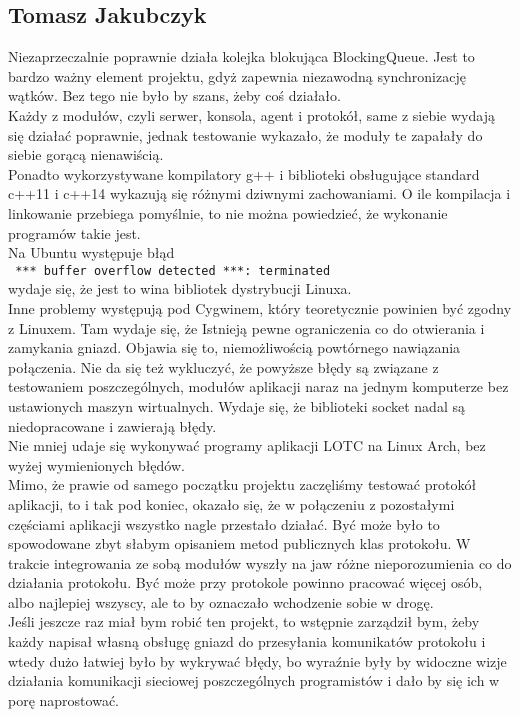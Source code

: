 \documentclass[10pt,a4paper]{article}
\begin{document}
        \subsection{Tomasz Jakubczyk}
            Niezaprzeczalnie poprawnie działa kolejka blokująca BlockingQueue. Jest to bardzo ważny element projektu, gdyż zapewnia niezawodną synchronizację wątków. Bez tego nie było by szans, żeby coś działało. \\
            Każdy z modułów, czyli serwer, konsola, agent i protokół, same z siebie wydają się działać poprawnie, jednak testowanie wykazało, że moduły te zapałały do siebie gorącą nienawiścią. \\
            Ponadto wykorzystywane kompilatory g++ i biblioteki obsługujące standard c++11 i c++14 wykazują się różnymi dziwnymi zachowaniami. O ile kompilacja i linkowanie przebiega pomyślnie, to nie można powiedzieć, że wykonanie programów takie jest. \\
            Na Ubuntu występuje błąd \\
            \texttt{ *** buffer overflow detected ***: terminated } \\
            wydaje się, że jest to wina bibliotek dystrybucji Linuxa. \\
            Inne problemy występują pod Cygwinem, który teoretycznie powinien być zgodny z Linuxem. Tam wydaje się, że Istnieją pewne ograniczenia co do otwierania i zamykania gniazd. Objawia się to, niemożliwością powtórnego nawiązania połączenia. Nie da się też wykluczyć, że powyższe błędy są związane z testowaniem poszczególnych, modułów aplikacji naraz na jednym komputerze bez ustawionych maszyn wirtualnych. Wydaje się, że biblioteki socket nadal są niedopracowane i zawierają błędy. \\
            Nie mniej udaje się wykonywać programy aplikacji LOTC na Linux Arch, bez wyżej wymienionych błędów. \\
            Mimo, że prawie od samego początku projektu zaczęliśmy testować protokół aplikacji, to i tak pod koniec, okazało się, że w połączeniu z pozostałymi częściami aplikacji wszystko nagle przestało działać. Być może było to spowodowane zbyt słabym opisaniem metod publicznych klas protokołu. W trakcie integrowania ze sobą modułów wyszły na jaw różne nieporozumienia co do działania protokołu. Być może przy protokole powinno pracować więcej osób, albo najlepiej wszyscy, ale to by oznaczało wchodzenie sobie w drogę. \\
            Jeśli jeszcze raz miał bym robić ten projekt, to wstępnie zarządził bym, żeby każdy napisał własną obsługę gniazd do przesyłania komunikatów protokołu i wtedy dużo łatwiej było by wykrywać błędy, bo wyraźnie były by widoczne wizje działania komunikacji sieciowej poszczególnych programistów i dało by się ich w porę naprostować. \\
\end{document}
